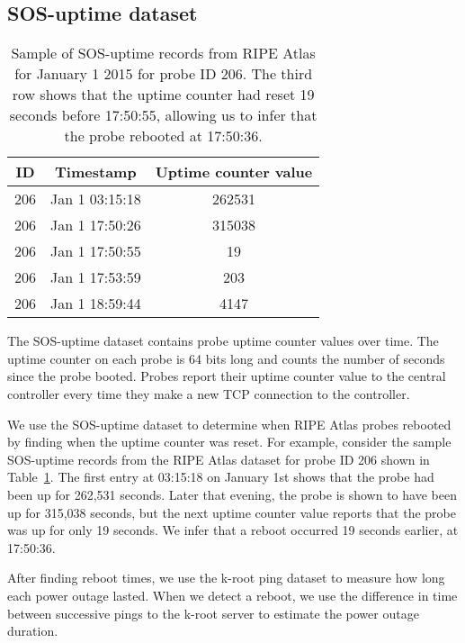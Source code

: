 \subsection{SOS-uptime dataset}
\label{sec:sos}

\begin{table}[th]
  \small
  \centering
  \begin{tabular}{c|c|c}
    \textbf{ID} & \textbf{Timestamp} & \textbf{Uptime counter value}\\
    \hline
    206 & Jan 1 03:15:18 & 262531\\
    206 & Jan 1 17:50:26 & 315038\\
    206 & Jan 1 17:50:55 & 19\\
    206 & Jan 1 17:53:59 & 203\\
    206 & Jan 1 18:59:44 & 4147\\
    \end{tabular}
    \caption{Sample of SOS-uptime records from RIPE Atlas for January 1 2015 for probe ID 206. The third row shows that the uptime counter had reset 19 seconds before 17:50:55, allowing us to infer that the probe rebooted at 17:50:36.}
    \label{tbl:sample_sos}
\end{table}

The SOS-uptime dataset contains probe uptime counter
values over time. The uptime counter on each probe is 64
bits long and counts the number of seconds since the probe
booted. Probes report their uptime counter value to the
central controller every time they make a new TCP connection
to the controller.

We use the SOS-uptime dataset to determine when RIPE Atlas probes rebooted
by finding when the uptime counter was
reset. For example, consider the sample SOS-uptime records from the
RIPE Atlas dataset for probe ID 206 shown in
Table~\ref{tbl:sample_sos}. The first entry at 03:15:18 on January 1st
shows that the probe had been up for 262,531 seconds. Later that
evening, the probe is shown to have been up for 315,038 seconds, but
the next uptime counter value reports that the probe was up for only
19 seconds. We infer that a reboot occurred 19 seconds earlier, at
17:50:36. 

After finding reboot times, we use the k-root ping dataset
to measure how long each power outage lasted. 
 When we detect a reboot, we use the difference in time between
successive pings to the k-root server to estimate the power outage duration. 

